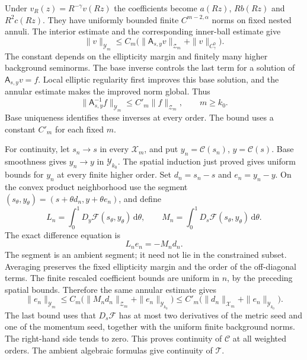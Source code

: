 \documentclass[
  english,
  11pt,
  reqno]{amsart}
\begin{document}
Under \(v_R(z)=R^{-\gamma}v(Rz)\) the coefficients become \(a(Rz)\),
\(Rb(Rz)\) and \(R^2c(Rz)\). They have uniformly bounded finite
\(C^{m-2,\alpha}\) norms on fixed nested annuli. The interior estimate
and the corresponding inner-ball estimate give%
 \[
\|v\|_{\mathcal Y_m}
\le C_m\bigl(\|\mathsf A_{s,y}v\|_{\mathcal Z_m}
+\|v\|_{C^0_\gamma}\bigr).
\] The constant depends on the ellipticity margin and finitely many
higher background seminorms. The base inverse controls the last term for
a solution of \(\mathsf A_{s,y}v=f\). Local elliptic regularity first
improves this base solution, and the annular estimate makes the improved
norm global. Thus%
 \[
\|\mathsf A_{s,y}^{-1}f\|_{\mathcal Y_m}
\le C'_m\|f\|_{\mathcal Z_m},
\qquad m\ge k_0.
\] Base uniqueness identifies these inverses at every order. The bound
uses a constant \(C'_m\) for each fixed \(m\).

For continuity, let \(s_n\to s\) in every \(\mathcal X_m\), and put
\(y_n=\mathcal C(s_n)\), \(y=\mathcal C(s)\). Base smoothness gives
\(y_n\to y\) in \(\mathcal Y_{k_0}\). The spatial induction just proved
gives uniform bounds for \(y_n\) at every finite higher order. Set
\(d_n=s_n-s\) and \(e_n=y_n-y\). On the convex product neighborhood use
the segment \((s_\theta,y_\theta)=(s+\theta d_n,y+\theta e_n)\), and
define \[
L_n=\int_0^1D_y\mathcal F(s_\theta,y_\theta)\,\mathrm d\theta,
\qquad
M_n=\int_0^1D_s\mathcal F(s_\theta,y_\theta)\,\mathrm d\theta.
\] The exact difference equation is%
 \[
L_ne_n=-M_nd_n.
\] The segment is an ambient segment; it need not lie in the constrained
subset. Averaging preserves the fixed ellipticity margin and the order
of the off-diagonal terms. The finite rescaled coefficient bounds are
uniform in \(n\), by the preceding spatial bounds. Therefore the same
annular estimate gives%
 \[
\|e_n\|_{\mathcal Y_m}
\le C_m\bigl(\|M_nd_n\|_{\mathcal Z_m}
+\|e_n\|_{\mathcal Y_{k_0}}\bigr)
\le C'_m\bigl(\|d_n\|_{\mathcal X_m}
+\|e_n\|_{\mathcal Y_{k_0}}\bigr).
\] The last bound uses that \(D_s\mathcal F\) has at most two
derivatives of the metric seed and one of the momentum seed, together
with the uniform finite background norms. The right-hand side tends to
zero. This proves continuity of \(\mathcal C\) at all weighted orders.
The ambient algebraic formulas give continuity of \(\mathcal T\).
\end{document}
